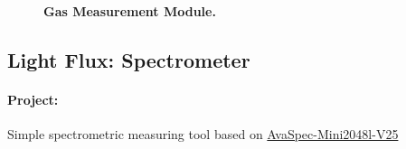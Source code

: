 \documentclass[12pt,a4paper]{scrartcl}
\begin{document}
\begin{figure}[ht]
  \begin{minipage}{.49\textwidth}
  \end{minipage}
  \begin{minipage}{.49\textwidth}
  \end{minipage}
\caption[]{\textbf{Gas Measurement Module.}}
\end{figure}

\clearpage
\subsection{Light Flux: Spectrometer} 
\label{spec}
\paragraph{Project:} 
Simple spectrometric measuring tool based on
\href{http://www.avantes.com/products/spectrometers/compactline/item/723-avaspec-mini}{AvaSpec-Mini2048l-V25}
\end{document}
